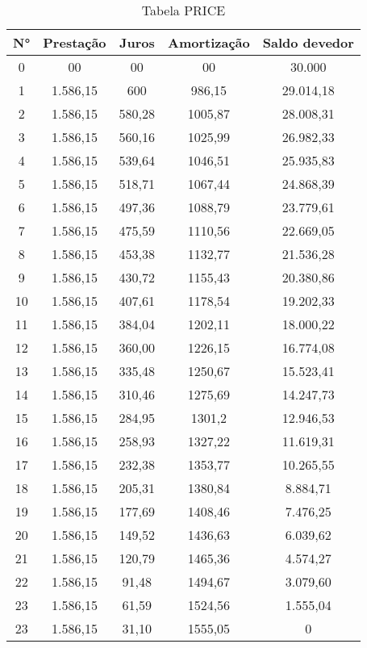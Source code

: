 \documentclass[report]{uftex}
\begin{document}
\begin{itemize}
	\begin{table}[h]
		\centering
		\begin{tabular}{c|c|c|c|c}
			\hline
			N° & Prestação & Juros & Amortização & Saldo devedor \\ 
			\hline
			0 & 00 & 00 & 00 & 30.000 \\
			\hline
			1 & 1.586,15 & 600 & 986,15
			 & 29.014,18 \\
			\hline
			2 & 1.586,15 & 580,28 & 1005,87
			 & 28.008,31 \\
			\hline
			3 & 1.586,15 & 560,16 & 1025,99
			 & 26.982,33 \\
			\hline
			4 & 1.586,15 & 539,64 & 1046,51
			 & 25.935,83 \\
			\hline
			5 & 1.586,15 & 518,71 & 1067,44
			 &  24.868,39\\
			\hline
			6 & 1.586,15 & 497,36 & 1088,79
			 & 23.779,61 \\
			\hline
			7 & 1.586,15 & 475,59 & 1110,56
			 & 22.669,05 \\
			\hline
			8 & 1.586,15 & 453,38 & 1132,77
			 & 21.536,28 \\
			\hline
			9 & 1.586,15 & 430,72 & 1155,43
			 & 20.380,86 \\
			\hline
			10 & 1.586,15 & 407,61 & 1178,54
			 & 19.202,33 \\
			\hline
		    11 & 1.586,15 & 384,04 & 1202,11
		     & 18.000,22 \\
			\hline
			12 & 1.586,15 & 360,00 & 1226,15
			 & 16.774,08 \\
			\hline
			13 & 1.586,15 & 335,48 & 1250,67
			 & 15.523,41 \\
			\hline
			14 & 1.586,15 & 310,46 & 1275,69
			 & 14.247,73 \\
			\hline
			15 & 1.586,15 & 284,95 & 1301,2
			 & 12.946,53 \\
			\hline
			16 & 1.586,15 & 258,93 & 1327,22
			 & 11.619,31 \\
			\hline
			17 & 1.586,15 & 232,38 & 1353,77
			 & 10.265,55 \\
			\hline
			18 & 1.586,15 & 205,31 & 1380,84
			 & 8.884,71 \\
			\hline
			19 & 1.586,15 & 177,69 & 1408,46
			 & 7.476,25 \\
			\hline
			20 & 1.586,15 & 149,52 & 1436,63
			 & 6.039,62 \\
			\hline
			21 & 1.586,15 & 120,79 & 1465,36
			 & 4.574,27 \\
			\hline
			22 & 1.586,15 & 91,48 & 1494,67
			 & 3.079,60 \\
			\hline
			23 & 1.586,15 & 61,59 & 1524,56
			 &  1.555,04 \\
			\hline
			23 & 1.586,15 & 31,10 & 1555,05
			 & 0 \\
			\hline
		\end{tabular}
		\caption{Tabela PRICE}
	\end{table}
	

\end{itemize}
\end{document}
